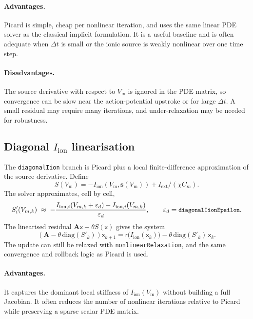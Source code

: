 \documentclass[11pt,a4paper]{article}
\newcommand{\code}[1]{\texttt{\small #1}}
\newcommand{\Vm}{V_{\text{m}}}
\newcommand{\Iion}{I_{\mathrm{ion}}}
\newcommand{\Aimp}{\mathbf{A}}
\newcommand{\Iext}{I_{\mathrm{ext}}}
\begin{document}
\paragraph{Advantages.}
Picard is simple, cheap per nonlinear iteration, and uses the same
linear PDE solver as the classical implicit formulation. It is a useful
baseline and is often adequate when $\Delta t$ is small or the ionic
source is weakly nonlinear over one time step.

\paragraph{Disadvantages.}
The source derivative with respect to $\Vm$ is ignored in the PDE
matrix, so convergence can be slow near the action-potential upstroke or
for large $\Delta t$. A small residual may require many iterations, and
under-relaxation may be needed for robustness.

\subsection{Diagonal \texorpdfstring{$\Iion$}{Iion} linearisation}

The \code{diagonalIion} branch is Picard plus a local finite-difference
approximation of the source derivative. Define
\[
  S(\Vm) = -\Iion(\Vm,\mathbf{s}(\Vm)) + \Iext/(\chi C_m).
\]
The solver approximates, cell by cell,
\begin{equation}
  S'_i(V_{m,k})
  \;\approx\;
  -\frac{
      I_{\mathrm{ion},i}(V_{m,k}+\varepsilon_d)
      - I_{\mathrm{ion},i}(V_{m,k})
    }{\varepsilon_d},
  \qquad
  \varepsilon_d=\code{diagonalIionEpsilon}.
\end{equation}
The linearised residual
$\Aimp\mathsf{x}-\theta S(\mathsf{x})$ gives the system
\begin{equation}
  \left(\Aimp-\theta\,\mathrm{diag}(S'_k)\right)\mathsf{x}_{k+1}
  =
  \mathsf{r}\!\bigl(\Iion(\mathsf{x}_{k})\bigr)
  - \theta\,\mathrm{diag}(S'_k)\,\mathsf{x}_{k}.
  \label{eq:diagonalIion}
\end{equation}
The update can still be relaxed with \code{nonlinearRelaxation}, and
the same convergence and rollback logic as Picard is used.

\paragraph{Advantages.}
It captures the dominant local stiffness of $\Iion(\Vm)$ without
building a full Jacobian. It often reduces the number of nonlinear
iterations relative to Picard while preserving a sparse scalar PDE
matrix.
\end{document}

